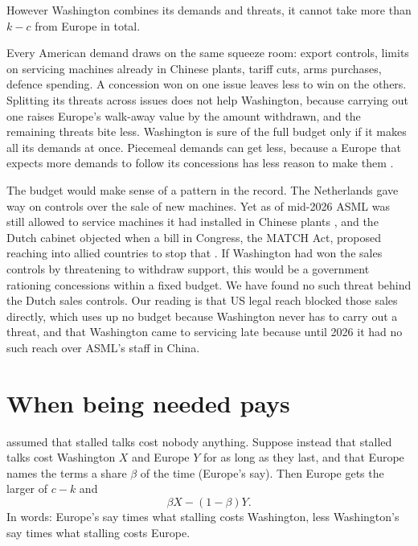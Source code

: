 \documentclass[11pt]{article}
\begin{document}
\begin{proposition}\label{min:budget}
However Washington combines its demands and threats, it cannot take more than $k-c$ from Europe in total.
\end{proposition}

Every American demand draws on the same squeeze room: export controls, limits on servicing machines already in Chinese plants, tariff cuts, arms purchases, defence spending. A concession won on one issue leaves less to win on the others. Splitting its threats across issues does not help Washington, because carrying out one raises Europe's walk-away value by the amount withdrawn, and the remaining threats bite less. Washington is sure of the full budget only if it makes all its demands at once. Piecemeal demands can get less, because a Europe that expects more demands to follow its concessions has less reason to make them \citep{pauly2024damned}.

The budget would make sense of a pattern in the record. The Netherlands gave way on controls over the sale of new machines. Yet as of mid-2026 ASML was still allowed to service machines it had installed in Chinese plants \citep{zakaria2026match}, and the Dutch cabinet objected when a bill in Congress, the MATCH Act, proposed reaching into allied countries to stop that \citep{baumgartner2026match, tk2026match}. If Washington had won the sales controls by threatening to withdraw support, this would be a government rationing concessions within a fixed budget. We have found no such threat behind the Dutch sales controls. Our reading is that US legal reach blocked those sales directly, which uses up no budget because Washington never has to carry out a threat, and that Washington came to servicing late because until 2026 it had no such reach over ASML's staff in China.

\section{When being needed pays}\label{sec:need}

 assumed that stalled talks cost nobody anything. Suppose instead that stalled talks cost Washington $X$ and Europe $Y$ for as long as they last, and that Europe names the terms a share $\beta$ of the time (Europe's say). Then Europe gets the larger of $c-k$ and
\[
\beta X-(1-\beta)Y .
\]
In words: Europe's say times what stalling costs Washington, less Washington's say times what stalling costs Europe.
\end{document}
